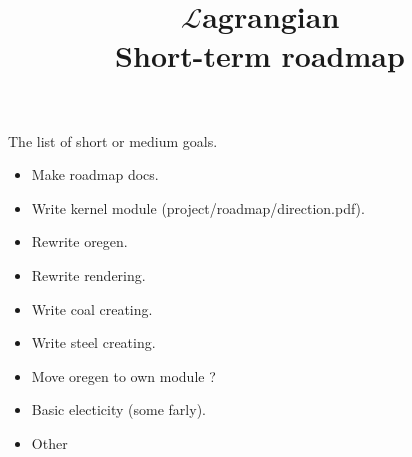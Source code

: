 \documentclass[12pt]{article}
\title{$\mathcal{L}$agrangian \\ Short-term roadmap}
\begin{document}
	\maketitle

	The list of short or medium goals.

    \begin{itemize}
		\item Make roadmap docs.
		\item Write kernel module (project/roadmap/direction.pdf).
		\item Rewrite oregen.
		\item Rewrite rendering.
		\item Write coal creating.
		\item Write steel creating.
		\item Move oregen to own module ?
		\item Basic electicity (some farly).
		\item Other
	\end{itemize}
\end{document}
